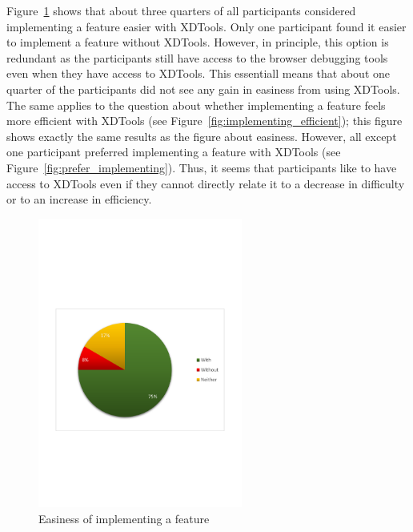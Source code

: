 Figure~\ref{fig:implementing_easier} shows that about three quarters of all participants considered implementing a feature easier with XDTools. Only one participant found it easier to implement a feature without XDTools. However, in principle, this option is redundant as the participants still have access to the browser debugging tools even when they have access to XDTools. This essentiall means that about one quarter of the participants did not see any gain in easiness from using XDTools. The same applies to the question about whether implementing a feature feels more efficient with XDTools (see Figure~\ref{fig:implementing_efficient}); this figure shows exactly the same results as the figure about easiness. However, all except one participant preferred implementing a feature with XDTools (see Figure~\ref{fig:prefer_implementing}). Thus, it seems that participants like to have access to XDTools even if they cannot directly relate it to a decrease in difficulty or to an increase in efficiency.
\begin{figure}[H]
  \centering
    \includegraphics[width=0.6\textwidth]{images/charts/implementing_easier.pdf}
	\caption[Easiness of implementing]{Easiness of implementing a feature}
	\label{fig:implementing_easier}
\end{figure}

